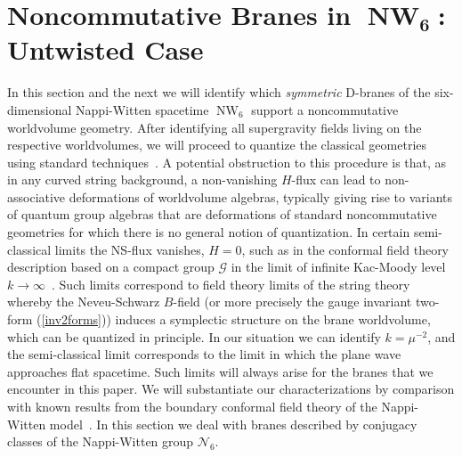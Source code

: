 \documentclass[11pt,a4paper]{article}
\DeclareMathOperator{\NW}{NW}
\newcommand{\mbf}[1]{{\boldsymbol {#1} }}
\newcommand{\newsection}{\setcounter{equation}{0}\section}
\begin{document}
\newsection{Noncommutative Branes in $\mbf{\NW_6}$: Untwisted
  Case\label{NCBranes}}

In this section and the next we will identify which {\it symmetric}
D-branes of the six-dimensional Nappi-Witten spacetime $\NW_6$ support a
noncommutative worldvolume geometry. After identifying all
supergravity fields living on the respective worldvolumes, we will
proceed to quantize the classical geometries using standard
techniques~\cite{Schom1}. A potential obstruction to this procedure is
that, as in any curved string background, a non-vanishing $H$-flux can lead to
non-associative deformations of worldvolume algebras, typically
giving rise to variants of quantum group algebras that are
deformations of standard noncommutative geometries for which there is
no general notion of quantization. In certain semi-classical
limits the NS-flux vanishes, $H=0$, such as in the conformal field
theory description based on a compact group $\mathcal{G}$ in the limit
of infinite Kac-Moody level $k\to\infty$~\cite{ARS1}. Such limits correspond to
field theory limits of the string theory whereby the Neveu-Schwarz
$B$-field (or more precisely the gauge invariant two-form
(\ref{inv2forms})) induces a symplectic structure on the brane
worldvolume, which can be quantized in principle. In our
situation we can identify $k=\mu^{-2}$, and the semi-classical limit
corresponds to the limit in which the plane wave approaches flat
spacetime. Such limits will always arise for the branes that we
encounter in this paper. We will substantiate our characterizations by
comparison with known results from the boundary conformal field theory
of the Nappi-Witten model~\cite{DK2,Hikida1}. In this section we deal
with branes described by conjugacy classes of the Nappi-Witten group
$\mathcal{N}_6$.
\end{document}
